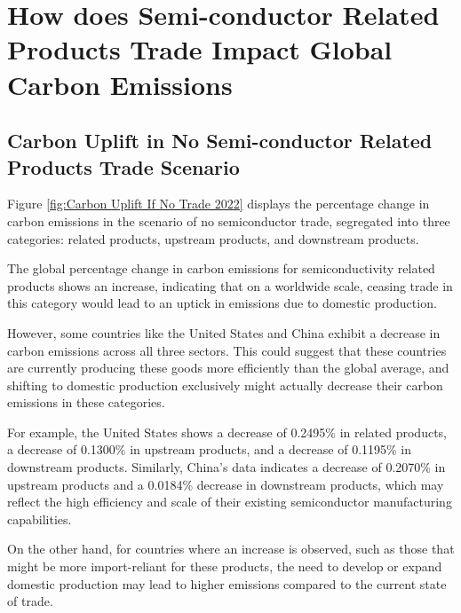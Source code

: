 \section{How does Semi-conductor Related Products Trade Impact Global Carbon Emissions}

\subsection{Carbon Uplift in No Semi-conductor Related Products Trade Scenario}

Figure \ref{fig:Carbon Uplift If No Trade 2022} displays the percentage change in carbon emissions in the scenario of no semiconductor trade, segregated into three categories: related products, upstream products, and downstream products.

The global percentage change in carbon emissions for semiconductivity related products shows an increase, indicating that on a worldwide scale, ceasing trade in this category would lead to an uptick in emissions due to domestic production.

However, some countries like the United States and China exhibit a decrease in carbon emissions across all three sectors. This could suggest that these countries are currently producing these goods more efficiently than the global average, and shifting to domestic production exclusively might actually decrease their carbon emissions in these categories.

For example, the United States shows a decrease of 0.2495\% in related products, a decrease of 0.1300\% in upstream products, and a decrease of 0.1195\% in downstream products. Similarly, China's data indicates a decrease of 0.2070\% in upstream products and a 0.0184\% decrease in downstream products, which may reflect the high efficiency and scale of their existing semiconductor manufacturing capabilities.

On the other hand, for countries where an increase is observed, such as those that might be more import-reliant for these products, the need to develop or expand domestic production may lead to higher emissions compared to the current state of trade.

